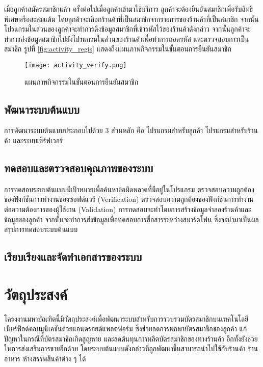\documentclass[a4paper]{article}
\begin{document}
เมื่อลูกค้าสมัครสมาชิกแล้ว ครั้งต่อไปเมื่อลูกค้าเข้ามาใช้บริการ ลูกค้าจะต้องยืนยันสมาชิกเพื่อรับสิทธิพิเศษหรือสะสมแต้ม โดยลูกค้าจะเลือกร้านค้าที่เป็นสมาชิกจากรายการของร้านค้าที่เป็นสมาชิก จากนั้นโปรแกรมในส่วนของลูกค้าจะทำการดึงข้อมูลสมาชิกที่เข้ารหัสไว้ของร้านค้าดังกล่าว จากนั้นลูกค้าจะทำการส่งข้อมูลสมาชิกไปยังโปรแกรมในส่วนของร้านค้าเพื่อทำการถอดรหัส และตรวจสอบการเป็นสมาชิก รูปที่ \ref{fig:activity_regis} แสดงถึงแผนภาพกิจกรรมในขั้นตอนการยืนยันสมาชิก

\begin{figure}[ht!]
\centering
\texttt{[image: activity\_verify.png]}
\caption{แผนภาพกิจกรรมในขั้นตอนการยืนยันสมาชิก} \label{fig:activity_verify}
\label{overflow}
\end{figure}

\subsection{พัฒนาระบบต้นแบบ}
การพัฒนาระบบต้นแบบประกอบไปด้วย 3 ส่วนหลัก คือ โปรแกรมสำหรับลูกค้า โปรแกรมสำหรับร้านค้า และระบบเซิร์ฟเวอร์

\subsection{ทดสอบและตรวจสอบคุณภาพของระบบ}
การทดสอบระบบต้นแบบมีเป้าหมายเพื่อค้นหาข้อผิดพลาดที่มีอยู่ในโปรแกรม ตรวจสอบความถูกต้องของฟังก์ชันการทำงานของซอฟต์แวร์ (Verification) ตรวจสอบความถูกต้องของฟังก์ช้นการทํางานต่อความต้องการของผู้ใช้งาน (Validation) การทดสอบจะทำโดยการสร้างข้อมูลจำลองร้านค้าและข้อมูลของลูกค้า จากนั้นจะทำการส่งข้อมูลเพื่อทดสอบการสื่อสารระหว่างสมาร์ตโฟน ซึ่งจะนํามาเป็นผลสรุปการทดสอบระบบต้นแบบ

\subsection{เรียบเรียงและจัดทําเอกสารของระบบ}


\section{วัตถุประสงค์}
โครงงานมหาบัณฑิตนี้มีวัตถุประสงค์เพื่อพัฒนาระบบสำหรับการรวบรวมบัตรสมาชิกบนเทคโนโลยีเนียร์ฟิลด์คอมมูนิเคชันด้วยแอนดรอยด์แพลตฟอร์ม ซึ่งช่วยลดการพกพาบัตรสมาชิกของลูกค้า แก้ปัญหาในกรณีที่บัตรสมาชิกเกิดสูญหาย และลดต้นทุนการผลิตบัตรสมาชิกของทางร้านค้า อีกทั้งยังช่วยในการส่งเสริมการขายอีกด้วย โดยระบบต้นแบบดังกล่าวที่ถูกพัฒนาขึ้นสามารถนำไปใช้กับร้านค้า ร้านอาหาร ห้างสรรพสินค้าต่าง ๆ ได้
\end{document}
